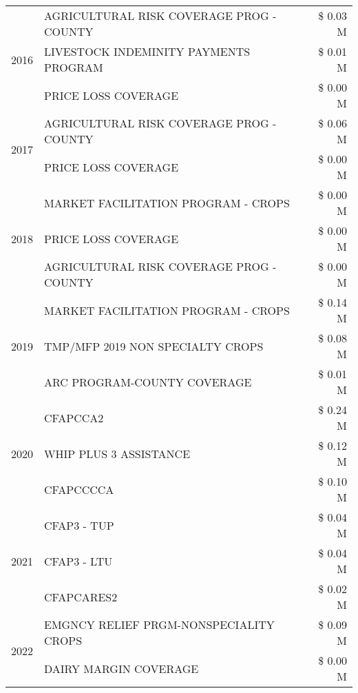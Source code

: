 \begin{tabular}{llr}
\cline{1-3}
\multirow[t]{3}{*}{2016} & AGRICULTURAL RISK COVERAGE PROG - COUNTY & \$ 0.03 M \\
 & LIVESTOCK INDEMINITY PAYMENTS PROGRAM & \$ 0.01 M \\
 & PRICE LOSS COVERAGE & \$ 0.00 M \\
\cline{1-3}
\multirow[t]{2}{*}{2017} & AGRICULTURAL RISK COVERAGE PROG - COUNTY & \$ 0.06 M \\
 & PRICE LOSS COVERAGE & \$ 0.00 M \\
\cline{1-3}
\multirow[t]{3}{*}{2018} & MARKET FACILITATION PROGRAM - CROPS & \$ 0.00 M \\
 & PRICE LOSS COVERAGE & \$ 0.00 M \\
 & AGRICULTURAL RISK COVERAGE PROG - COUNTY & \$ 0.00 M \\
\cline{1-3}
\multirow[t]{3}{*}{2019} & MARKET FACILITATION PROGRAM - CROPS & \$ 0.14 M \\
 & TMP/MFP 2019 NON SPECIALTY CROPS & \$ 0.08 M \\
 & ARC PROGRAM-COUNTY COVERAGE & \$ 0.01 M \\
\cline{1-3}
\multirow[t]{3}{*}{2020} & CFAPCCA2 & \$ 0.24 M \\
 & WHIP PLUS 3 ASSISTANCE & \$ 0.12 M \\
 & CFAPCCCCA & \$ 0.10 M \\
\cline{1-3}
\multirow[t]{3}{*}{2021} & CFAP3 - TUP & \$ 0.04 M \\
 & CFAP3 - LTU & \$ 0.04 M \\
 & CFAPCARES2 & \$ 0.02 M \\
\cline{1-3}
\multirow[t]{2}{*}{2022} & EMGNCY RELIEF PRGM-NONSPECIALITY CROPS & \$ 0.09 M \\
 & DAIRY MARGIN COVERAGE & \$ 0.00 M \\
\cline{1-3}
\bottomrule
\end{tabular}

